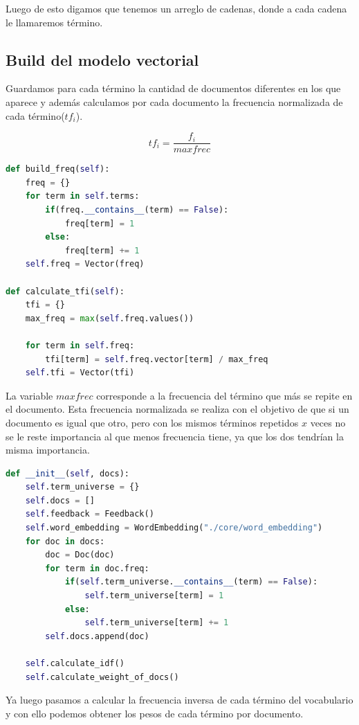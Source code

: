 \documentclass{llncs}
\begin{document}
Luego de esto digamos que tenemos un arreglo de cadenas, donde a cada cadena le llamaremos término.


\subsection{Build del modelo vectorial}


Guardamos para cada término la cantidad de documentos diferentes en los que aparece y además calculamos por cada documento la frecuencia normalizada de cada término($tf_i$).

$$ tf_i = \frac{f_i} {maxfrec} $$

\begin{lstlisting}[language=Python]
def build_freq(self):
    freq = {}
    for term in self.terms:
        if(freq.__contains__(term) == False):
            freq[term] = 1
        else:
            freq[term] += 1
    self.freq = Vector(freq)

def calculate_tfi(self):
    tfi = {}
    max_freq = max(self.freq.values())

    for term in self.freq:
        tfi[term] = self.freq.vector[term] / max_freq
    self.tfi = Vector(tfi)
\end{lstlisting}

La variable $maxfrec$ corresponde a la frecuencia del término que más se repite en el documento. Esta frecuencia normalizada se realiza con el objetivo de que si un documento es igual que otro, pero con los mismos términos repetidos $x$ veces no se le reste importancia al que menos frecuencia tiene, ya que los dos tendrían la misma importancia.

\begin{lstlisting}[language=Python]
def __init__(self, docs):
    self.term_universe = {}
    self.docs = []
    self.feedback = Feedback()
    self.word_embedding = WordEmbedding("./core/word_embedding")
    for doc in docs:
        doc = Doc(doc)
        for term in doc.freq:
            if(self.term_universe.__contains__(term) == False):
                self.term_universe[term] = 1
            else:
                self.term_universe[term] += 1
        self.docs.append(doc)

    self.calculate_idf()
    self.calculate_weight_of_docs()
\end{lstlisting}

Ya luego pasamos a calcular la frecuencia inversa de cada término del vocabulario y con ello podemos obtener los pesos de cada término por documento.
\end{document}

